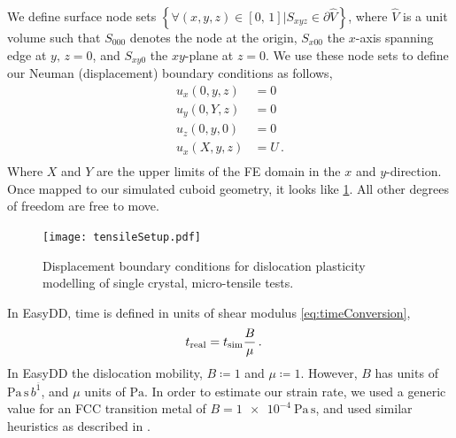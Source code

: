 We define surface node sets $\left\{\forall (x, y, z) \in [0,\, 1] \vert S_{xyz} \in \partial \hat{V}\right\}$, where $\hat{V}$ is a unit volume such that $S_{000}$ denotes the node at the origin, $S_{x00}$ the $x$-axis spanning edge at $y,\, z=0$, and $S_{xy0}$ the $xy$-plane at $z=0$. We use these node sets to define our Neuman (displacement) boundary conditions as follows,
\begin{subequations}
    \begin{align}
        u_x(0, y, z) & = 0    \\
        u_y(0, Y, z) & = 0    \\
        u_z(0, y, 0) & = 0    \\
        u_x(X, y, z) & = U\,. \\
    \end{align}
\end{subequations}
Where $X$ and $Y$ are the upper limits of the FE domain in the $x$ and $y$-direction. Once mapped to our simulated cuboid geometry, it looks like \cref{f:tensileSetup}. All other degrees of freedom are free to move.
\begin{figure}
    \centering
    \texttt{[image: tensileSetup.pdf]}
    \caption[Displacement boundary conditions for dislocation plasticity modelling of single crystal, micro-tensile tests.]{Displacement boundary conditions for dislocation plasticity modelling of single crystal, micro-tensile tests.}
    \label{f:tensileSetup}
\end{figure}

In EasyDD, time is defined in units of shear modulus \cref{eq:timeConversion},
\begin{align}\label{eq:timeConversion}
    t_{\textrm{real}} & = t_{\textrm{sim}} \dfrac{B}{\mu}\,.
\end{align}
In EasyDD the dislocation mobility, $B \coloneqq 1$ and $\mu \coloneqq 1$. However, $B$ has units of $\si{\pascal\,\second\,b^{\overline{1}}}$, and $\mu$ units of $\si{\pascal}$. In order to estimate our strain rate, we used a generic value for an FCC transition metal of $B = \SI{1e-4}{\pascal\,\second}$, and used similar heuristics as described in \cite[p.~237]{ddlab}.


